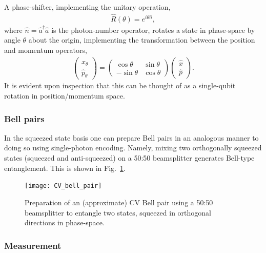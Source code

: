 A phase-shifter, implementing the unitary operation,
\begin{align}
\hat{R}(\theta) = e^{i\theta \hat{n}},
\end{align}
where \mbox{$\hat{n}=\hat a^\dag \hat a$} is the photon-number operator, rotates a state in phase-space by angle $\theta$ about the origin, implementing the transformation between the position and momentum operators,
\begin{align}\label{eq:xp_theta}
\begin{pmatrix}
\hat x_{\theta}\\
\hat p_{\theta}
\end{pmatrix}
=
\begin{pmatrix}\cos\theta & \sin\theta \\
-\sin\theta & \cos\theta
\end{pmatrix}
\begin{pmatrix}
\hat x\\
\hat p
\end{pmatrix}.
\end{align}
It is evident upon inspection that this can be thought of as a single-qubit rotation in position/momentum space.

%
%

\subsubsection{Bell pairs}\label{sec:CV_bell_pairs}

In the squeezed state basis one can prepare Bell pairs in an analogous manner to doing so using single-photon encoding. Namely, mixing two orthogonally squeezed states (squeezed and anti-squeezed) on a 50:50 beamsplitter generates Bell-type entanglement. This is shown in Fig.~\ref{fig:CV_bell_pair}.

\begin{figure}[!htbp]
\texttt{[image: CV\_bell\_pair]}
\captionspacefig \caption{Preparation of an (approximate) CV Bell pair using a 50:50 beamsplitter to entangle two states, squeezed in orthogonal directions in phase-space.}\label{fig:CV_bell_pair}	
\end{figure}

%
%

\subsubsection{Measurement}

